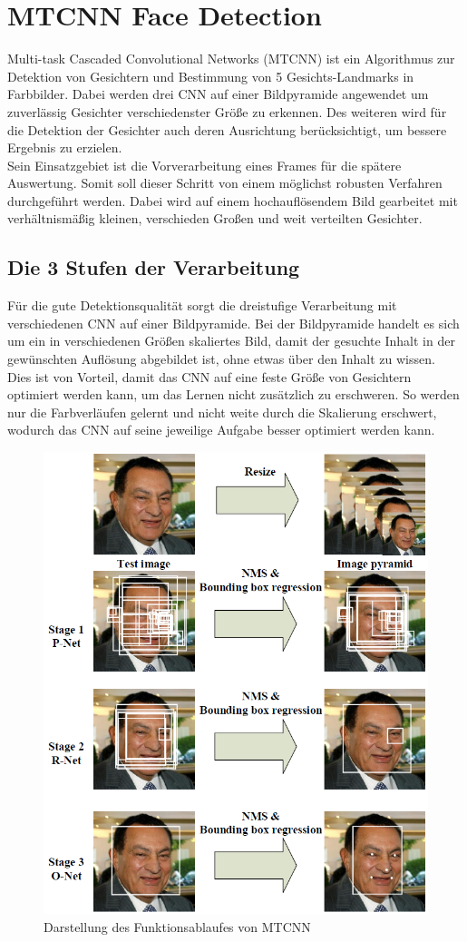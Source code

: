 \section{MTCNN Face Detection}
\label{MTCNN}
Multi-task Cascaded Convolutional Networks (MTCNN) ist ein Algorithmus zur Detektion von Gesichtern und Bestimmung von 5 Gesichts-Landmarks in Farbbilder. Dabei werden drei CNN auf einer Bildpyramide angewendet um zuverlässig Gesichter verschiedenster Größe zu erkennen. Des weiteren wird für die Detektion der Gesichter auch deren Ausrichtung berücksichtigt, um bessere Ergebnis zu erzielen.\\
Sein Einsatzgebiet ist die Vorverarbeitung eines Frames für die spätere Auswertung. Somit soll dieser Schritt von einem möglichst robusten Verfahren durchgeführt werden. Dabei wird auf einem hochauflösendem Bild gearbeitet mit verhältnismäßig kleinen, verschieden Großen und weit verteilten Gesichter.
\subsection{Die 3 Stufen der Verarbeitung}
Für die gute Detektionsqualität sorgt die dreistufige Verarbeitung mit verschiedenen CNN auf einer Bildpyramide. Bei der Bildpyramide handelt es sich um ein in verschiedenen Größen skaliertes Bild, damit der gesuchte Inhalt in der gewünschten Auflösung abgebildet ist, ohne etwas über den Inhalt zu wissen.\\
Dies ist von Vorteil, damit das CNN auf eine feste Größe von Gesichtern optimiert werden kann, um das Lernen nicht zusätzlich zu erschweren. So werden nur die Farbverläufen gelernt und nicht weite durch die Skalierung erschwert, wodurch das CNN auf seine jeweilige Aufgabe besser optimiert werden kann.
\begin{figure}
	\centering
	\includegraphics[width=0.6\linewidth]{img/MTCNN_Step}
	\caption{Darstellung des Funktionsablaufes von MTCNN\cite{MTCCN}}
	\label{img_MTCNN_Step}
\end{figure}
